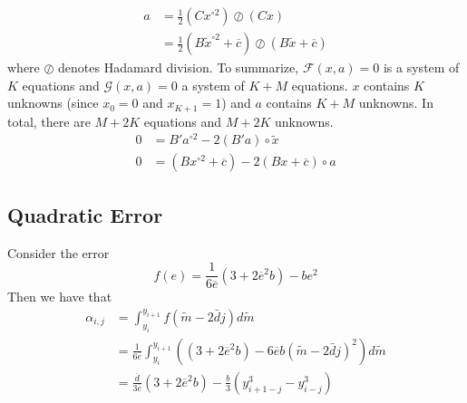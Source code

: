 \documentclass[12pt]{article}
\begin{document}
\begin{align}
	a&=\frac{1}{2}(Cx^{\circ 2})\oslash(Cx)\\
	&=\frac{1}{2}(B\widetilde{x}^{\circ 2}+\overline{c})\oslash(B\widetilde{x}+\overline{c})
\end{align}
where $\oslash$ denotes Hadamard division. To summarize, $\mathcal{F}(x,a)=0$ is a system of $K$ equations and $\mathcal{G}(x,a)=0$ a system of $K+M$ equations. $x$ contains $K$ unknowns (since $x_{0}=0$ and $x_{K+1}=1$) and $a$ contains $K+M$ unknowns. In total, there are $M+2K$ equations and $M+2K$ unknowns. 
\begin{align}
	0&=B'a^{\circ 2}-2(B'a)\circ\widetilde{x}\\
	0&=(Bx^{\circ 2}+\overline{c})-2(Bx+\overline{c})\circ a
\end{align}
\subsection{Quadratic Error}
Consider the error 
\begin{equation}
	f(e)=\frac{1}{6\overline{e}}\left(3+2\overline{e}^{2}b\right)-be^{2}
\end{equation}
Then we have that
\begin{align}
	\alpha_{i,j}&=\int_{y_{i}}^{y_{i+1}}{f(\widetilde{m}-2\bar{d}j)d\widetilde{m}}\\
	&=\frac{1}{6\overline{e}}\int_{y_{i}}^{y_{i+1}}{\left(\left(3+2\overline{e}^{2}b\right)-6\overline{e}b(\widetilde{m}-2\bar{d}j)^{2}\right)d\widetilde{m}}\\
	&=\frac{\overline{d}}{3\overline{e}}\left(3+2\overline{e}^{2}b\right)-\frac{b}{3}\left(y_{i+1-j}^{3}-y_{i-j}^{3}\right)
\end{align}
\pagebreak
\end{document}

